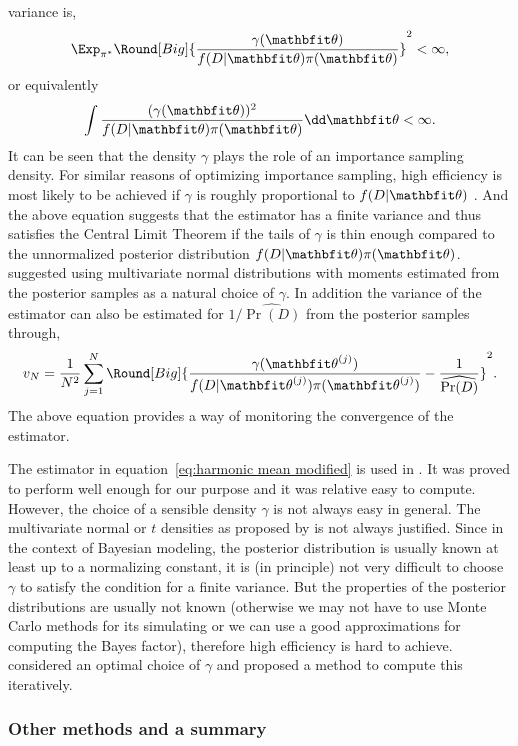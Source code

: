 variance is,
\begin{equation}
  \Exp_{\pi^*}\Round[Big]{\frac{\gamma(\bth)}{f(D|\bth)\pi(\bth)}}^2 < \infty,
\end{equation}
or equivalently
\begin{equation}
  \int \frac{(\gamma(\bth))^2}{f(D|\bth)\pi(\bth)}\dd\bth < \infty.
\end{equation}
It can be seen that the density $\gamma$ plays the role of an importance
sampling density. For similar reasons of optimizing importance sampling, high
efficiency is most likely to be achieved if $\gamma$ is roughly proportional
to $f(D|\bth)$ \parencite{Kass1995}. And the above equation suggests that the
estimator has a finite variance and thus satisfies the Central Limit Theorem
if the tails of $\gamma$ is thin enough compared to the unnormalized posterior
distribution $f(D|\bth)\pi(\bth)$. \textcite{Gelfand1994} suggested using
multivariate normal distributions with moments estimated from the posterior
samples as a natural choice of $\gamma$. In addition the variance of the
estimator can also be estimated for $1/\widehat{\Pr(D)}$ from the posterior
samples through,
\begin{equation}
  v_N = \frac{1}{N^2}\sum_{j=1}^N \Round[Big]{
    \frac{\gamma(\bth^{(j)})}{f(D|\bth^{(j)})\pi(\bth^{(j)})}
    - \frac{1}{\widehat{\Pr(D)}}}^2.
\end{equation}
The above equation provides a way of monitoring the convergence of the
estimator.

The estimator in equation~\eqref{eq:harmonic mean modified} is used in
\textcite{Zhou2011}. It was proved to perform well enough for our purpose and
it was relative easy to compute. However, the choice of a sensible density
$\gamma$ is not always easy in general. The multivariate normal or $t$
densities as proposed by \textcite{Gelfand1994} is not always justified. Since
in the context of Bayesian modeling, the posterior distribution is usually
known at least up to a normalizing constant, it is (in principle) not very
difficult to choose $\gamma$ to satisfy the condition for a finite variance.
But the properties of the posterior distributions are usually not known
(otherwise we may not have to use Monte Carlo methods for its simulating or we
can use a good approximations for computing the Bayes factor), therefore high
efficiency is hard to achieve. \textcite{Meng1996} considered an optimal
choice of $\gamma$ and proposed a method to compute this iteratively.

\subsubsection{Other methods and a summary}
\label{ssub:Other methods and a summary a}


